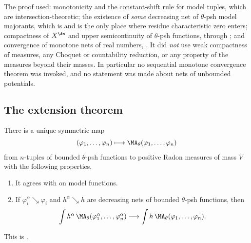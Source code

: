 \begin{remark}
\label{rem:ch24-energy-extension-audit}
The proof used: monotonicity and the constant-shift rule for model tuples,
which are intersection-theoretic; the existence of \emph{some} decreasing
net of \(\theta\)-psh model majorants, which is
 and is the only place where
residue characteristic zero enters; compactness of \(X^{\An}\) and upper
semicontinuity of \(\theta\)-psh functions, through
; and convergence of monotone nets of real numbers,
.  It did \emph{not} use weak compactness
of measures, any Choquet or countability reduction, or any property of the
measures beyond their masses.  In particular no sequential monotone
convergence theorem was invoked, and no statement was made about nets of
unbounded potentials.
\end{remark}

\subsection{The extension theorem}
\label{sec:ch24-extension-theorem}

\begin{theorem}\label{thm:bounded-ma-extension}
There is a unique symmetric map
\[
 (\varphi_1,\ldots,\varphi_n)\longmapsto
 \MA_\theta(\varphi_1,\ldots,\varphi_n)
\]
from \(n\)-tuples of bounded \(\theta\)-psh functions to positive Radon
measures of mass \(V\) with the following properties.
\begin{enumerate}
\item It agrees with  on model
functions.
\item If \(\varphi_i^\alpha\searrow\varphi_i\) and
\(h^\alpha\searrow h\) are decreasing nets of bounded
\(\theta\)-psh functions, then
\begin{equation}
\label{eq:weighted-monotone-ma}
 \int h^\alpha\,
   \MA_\theta(\varphi_1^\alpha,\ldots,\varphi_n^\alpha)
 \longrightarrow
 \int h\,\MA_\theta(\varphi_1,\ldots,\varphi_n).
\end{equation}
\end{enumerate}
This is \cite[Theorem~3.1]{BFJ15}.
\end{theorem}


